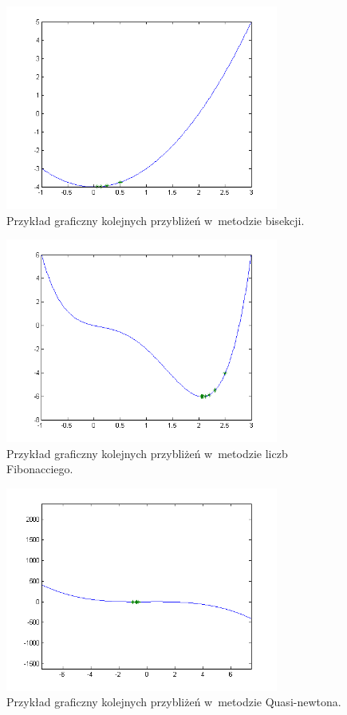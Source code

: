 \documentclass{classrep}
\begin{document}
	\begin{figure}[H]
  \centering
    \includegraphics[width=0.8\textwidth]{b_eps01}
	 \caption{Przykład graficzny kolejnych przybliżeń w~metodzie bisekcji.}
 \end{figure}
 \begin{figure}[H]
  \centering
    \includegraphics[width=0.8\textwidth]{f_eps001}
	 \caption{Przykład graficzny kolejnych przybliżeń w~metodzie liczb Fibonacciego.}
 \end{figure}
 \begin{figure}[H]
  \centering
    \includegraphics[width=0.8\textwidth]{q_eps0001}
	 \caption{Przykład graficzny kolejnych przybliżeń w~metodzie Quasi-newtona.}
 \end{figure}
 
\end{document}
